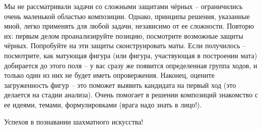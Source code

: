 \begin{multicols}{2}[]
Мы не рассматривали задачи со сложными защитами чёрных -- ограничились очень маленькой областью композиции. Однако, принципы решения, указанные мной, легко применять для любой задачи, независимо от ее сложности. Повторю их: первым делом проанализируйте позицию, посмотрите возможные защиты чёрных. Попробуйте на эти защиты сконструировать маты. Если получилось -- посмотрите, как матующая фигура (или фигура, участвующая в построении мата) добирается до этого поля -- у вас сразу же появится определенная группа ходов, и только один из них не будет иметь опровержения. Наконец, оцените загруженность фигур -- это поможет выявить кандидата на первый ход (это делается на стадии анализа). Очень помогает в решении композиций знакомство с ее идеями, темами, формулировками (врага надо знать в лицо!). 

Успехов в познавании шахматного искусства!
\end{multicols}
